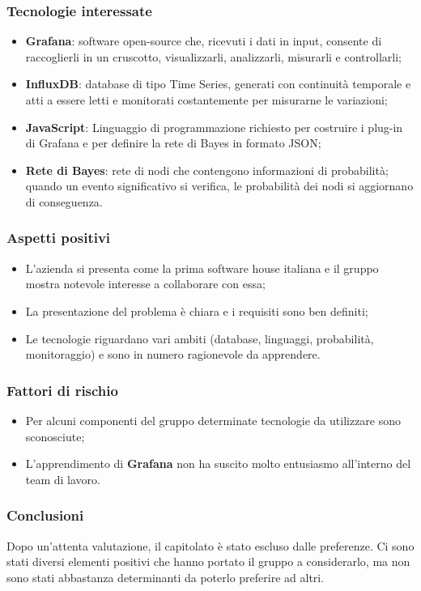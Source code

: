 \subsubsection{Tecnologie interessate}
\begin{itemize}
	\item \textbf{Grafana}: software open-source\glo{} che, ricevuti i dati in 
input,
	 consente di raccoglierli in un cruscotto, visualizzarli, analizzarli, 
	 misurarli e controllarli;
	\item \textbf{InfluxDB}: database di tipo Time Series\glo{}, generati con 
continuità
	 temporale e atti a essere letti e monitorati costantemente per misurarne 
	 le variazioni;
	\item \textbf{JavaScript}: Linguaggio di programmazione richiesto per costruire i plug-in\glo{} di Grafana e per definire la rete di Bayes\glo{} in formato JSON\glo;
	\item \textbf{Rete di Bayes}: rete di nodi che contengono informazioni di 
probabilità; quando un evento significativo si verifica, le probabilità dei nodi si aggiornano di conseguenza.
\end{itemize}
\subsubsection{Aspetti positivi}
\begin{itemize}
	\item L'azienda si presenta come la prima software house italiana e il gruppo 
mostra 
	notevole interesse a collaborare con essa;
	\item La presentazione del problema è chiara e i requisiti sono ben definiti;
	\item Le tecnologie riguardano vari ambiti (database, linguaggi, probabilità, 
	monitoraggio) e sono in numero ragionevole da apprendere.
\end{itemize}
\subsubsection{Fattori di rischio}
\begin{itemize}
	\item Per alcuni componenti del gruppo determinate tecnologie da  utilizzare 
	sono sconosciute;
	\item L'apprendimento di \textbf{Grafana} non ha suscito molto 
	entusiasmo all'interno del team di lavoro.
\end{itemize}
\subsubsection{Conclusioni}
Dopo un'attenta valutazione, il capitolato è stato escluso dalle preferenze. Ci 
sono stati diversi elementi positivi che hanno portato il gruppo a considerarlo,
ma non sono stati abbastanza determinanti da poterlo preferire ad altri.

